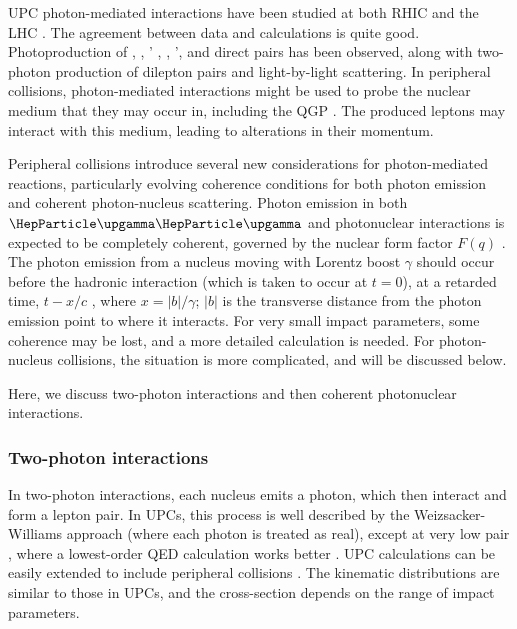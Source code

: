 \documentclass[../report.tex]{subfiles}
\begin{document}
UPC photon-mediated interactions have been studied at both RHIC and the LHC \cite{Baltz:2007kq,Bertulani:2005ru,Klein:2017nqo,Bertulani:1987tz,Baur:2001jj}.  The agreement between data and calculations is quite good.  Photoproduction of \PGr, \PGo, \PGr' , \PJGy, \PJGy', \PGU and direct \PGpp\PGpm pairs has been observed, along with two-photon production of dilepton pairs and light-by-light scattering.  In peripheral collisions, photon-mediated interactions might be used to probe the nuclear medium that they may occur in, including the QGP \cite{Aaboud:2018eph,Adam:2018tdm}. The produced leptons may interact with this medium, leading to alterations in their momentum.    

Peripheral collisions introduce several new considerations for  photon-mediated reactions, particularly evolving coherence conditions for both photon emission and coherent photon-nucleus scattering.  Photon emission in both $\PGg\PGg$ and photonuclear interactions is expected to be completely coherent, governed by the nuclear form factor $F(q)$ \cite{Vidovic:1992ik}.   The photon emission from a nucleus moving with Lorentz boost $\gamma$ should occur before the hadronic interaction (which is taken to occur at $t=0$), at a retarded time, $t-x/c$ \cite{Zha:2017jch}, where $x=|b|/\gamma$; $|b|$ is the transverse distance from the photon emission point to where it interacts. For very small impact parameters, some coherence may be lost, and a more detailed calculation is needed.  For photon-nucleus collisions, the situation is more complicated, and will be discussed below. 

Here, we discuss two-photon interactions and then coherent photonuclear interactions. 

\subsubsection{Two-photon interactions}

In two-photon interactions, each nucleus emits a photon, which then interact and form a lepton pair. In UPCs, this process is well described by the Weizsacker-Williams approach (where each photon is treated as real), except at very low pair \pT, where a lowest-order QED calculation works better \cite{Adams:2004rz}. UPC calculations can be easily extended to include peripheral collisions \cite{Klein:2018cjh, Zha:2018ywo,Klusek-Gawenda:2018zfz}.  The kinematic distributions are similar to those in UPCs, and the cross-section depends on the range of impact parameters.
\end{document}
